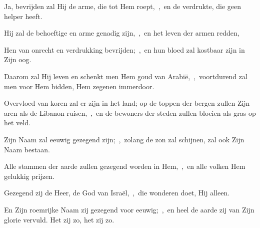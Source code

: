 \documentclass[12pt,twoside,a5paper]{article}
\begin{document}
\begin{halfparskip}
  Ja, bevrijden zal Hij de arme, die tot Hem roept,~\sep\ en de verdrukte, die geen helper heeft.

  Hij zal de behoeftige en arme genadig zijn,~\sep\ en het leven der armen redden,

  Hen van onrecht en verdrukking bevrijden;~\sep\ en hun bloed zal kostbaar zijn in Zijn oog.

  Daarom zal Hij leven en schenkt men Hem goud van Arabië,~\sep\ voortdurend zal men voor Hem bidden, Hem zegenen immerdoor.

  Overvloed van koren zal er zijn in het land; op de toppen der bergen zullen Zijn aren als de Libanon ruisen,~\sep\ en de bewoners der steden zullen bloeien als gras op het veld.

  Zijn Naam zal eeuwig gezegend zijn;~\sep\ zolang de zon zal schijnen, zal ook Zijn Naam bestaan.

  Alle stammen der aarde zullen gezegend worden in Hem,~\sep\ en alle volken Hem gelukkig prijzen.

  Gezegend zij de Heer, de God van Israël,~\sep\ die wonderen doet, Hij alleen.

  En Zijn roemrijke Naam zij gezegend voor eeuwig;~\sep\ en heel de aarde zij van Zijn glorie vervuld. Het zij zo, het zij zo.
\end{halfparskip}
\end{document}
